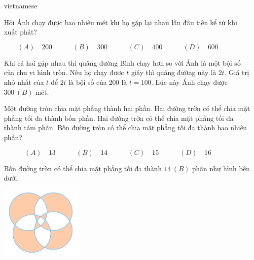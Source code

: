 \documentclass{article}
\begin{document}
\begin{otherlanguage*}{vietnamese}
\begin{problem*}[PI-2024-C-P29]
    Hỏi Ánh chạy được bao nhiêu mét khi họ gặp lại nhau lần đầu tiên kể từ khi xuất phát?

    \[
        (A) \quad 200 \qquad \quad
        (B) \quad 300 \qquad \quad
        (C) \quad 400 \qquad \quad
        (D) \quad 600 \qquad \quad
    \]
\end{problem*}

\begin{soln}
    Khi cả hai gặp nhau thì quãng đường Bình chạy hơn so với Ánh là một bội số của chu vi hình tròn.
    Nếu họ chạy đươc $t$ giây thì quãng đường này là $2t.$ Giá trị nhỏ nhất của $t$ để $2t$ là bội số của 200 là $t=100.$
    Lúc này Ánh chạy được $\boxed{300\ (B)}$ mét.
\end{soln}

\bigbreak

\begin{problem*}[PI-2024-C-P30]
    \label{problem:pi-2024-c-p30}

    Một đường tròn chia mặt phẳng thành hai phần.
    Hai đường trờn có thể chia mặt phẳng tối đa thành bốn phần.
    Hai đường trờn có thể chia mặt phẳng tối đa thành tám phần.
    Bốn đường tròn có thể chia mặt phẳng tối đa thành bao nhiêu phần?

    \[
        (A) \quad 13 \qquad \quad
        (B) \quad 14 \qquad \quad
        (C) \quad 15 \qquad \quad
        (D) \quad 16 \qquad \quad
    \]
\end{problem*}

\begin{soln}
    Bốn đường tròn có thể chia mặt phẳng tối đa thành $\boxed{14\ (B)}$ phần như hình bên dưới.
    \begin{center}
        \includegraphics[width=4cm]{./svg/pdf/pi-2024-c-p30.pdf}
    \end{center}
\end{soln}

\end{otherlanguage*}
\end{document}
